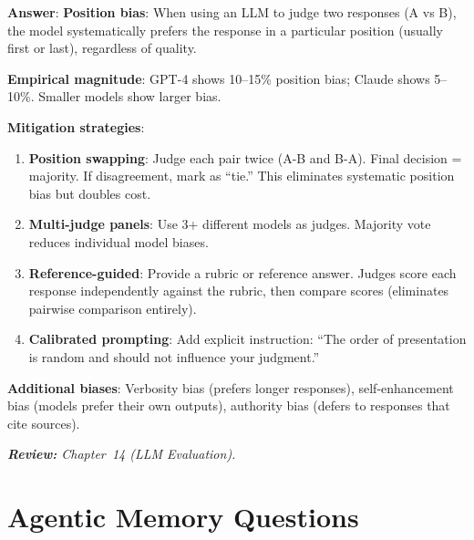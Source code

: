 \begin{questionbox}
\textbf{Answer}: \textbf{Position bias}: When using an LLM to judge two responses (A vs B), the model systematically prefers the response in a particular position (usually first or last), regardless of quality.

\textbf{Empirical magnitude}: GPT-4 shows 10--15\% position bias; Claude shows 5--10\%. Smaller models show larger bias.

\textbf{Mitigation strategies}:

\begin{enumerate}
  \item \textbf{Position swapping}: Judge each pair twice (A-B and B-A). Final decision = majority. If disagreement, mark as ``tie.'' This eliminates systematic position bias but doubles cost.
  \item \textbf{Multi-judge panels}: Use 3+ different models as judges. Majority vote reduces individual model biases.
  \item \textbf{Reference-guided}: Provide a rubric or reference answer. Judges score each response independently against the rubric, then compare scores (eliminates pairwise comparison entirely).
  \item \textbf{Calibrated prompting}: Add explicit instruction: ``The order of presentation is random and should not influence your judgment.''
\end{enumerate}

\textbf{Additional biases}: Verbosity bias (prefers longer responses), self-enhancement bias (models prefer their own outputs), authority bias (defers to responses that cite sources).

\emph{\textbf{Review:} Chapter~14 (LLM Evaluation).}
\end{questionbox}

\section{Agentic Memory Questions}
\label{agentic-memory-questions}

